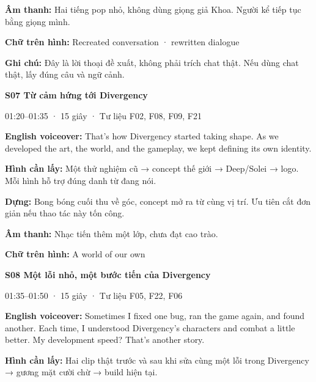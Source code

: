\documentclass[10pt,a4paper]{article}
\begin{document}
\textbf{Âm thanh:}  Hai tiếng pop nhỏ, không dùng giọng giả Khoa. Người kể tiếp tục bằng giọng mình.\par

\textbf{Chữ trên hình:}  Recreated conversation · rewritten dialogue\par

\textbf{Ghi chú:}  Đây là lời thoại đề xuất, không phải trích chat thật. Nếu dùng chat thật, lấy đúng câu và ngữ cảnh.\par

\textbf{S07 Từ cảm hứng tới Divergency}\par

01:20–01:35 · 15 giây · Tư liệu F02, F08, F09, F21\par

\textbf{English voiceover:}  That’s how Divergency started taking shape. As we developed the art, the world, and the gameplay, we kept defining its own identity.\par

\textbf{Hình cần lấy:}  Một thử nghiệm cũ → concept thế giới → Deep/Solei → logo. Mỗi hình hỗ trợ đúng danh từ đang nói.\par

\textbf{Dựng:}  Bong bóng cuối thu về góc, concept mở ra từ cùng vị trí. Ưu tiên cắt đơn giản nếu thao tác này tốn công.\par

\textbf{Âm thanh:}  Nhạc tiến thêm một lớp, chưa đạt cao trào.\par

\textbf{Chữ trên hình:}  A world of our own\par

\clearpage

\textbf{S08 Một lỗi nhỏ, một bước tiến của Divergency}\par

01:35–01:50 · 15 giây · Tư liệu F05, F22, F06\par

\textbf{English voiceover:}  Sometimes I fixed one bug, ran the game again, and found another. Each time, I understood Divergency’s characters and combat a little better. My development speed? That’s another story.\par

\textbf{Hình cần lấy:}  Hai clip thật trước và sau khi sửa cùng một lỗi trong Divergency → gương mặt cười chừ → build hiện tại.\par
\end{document}
